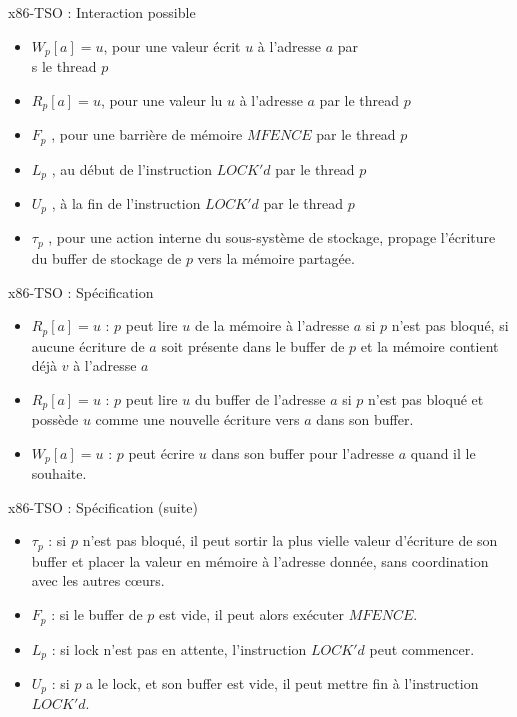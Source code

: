 \documentclass{beamer}
\begin{document}
\begin{frame}{x86-TSO : Interaction possible}
\begin{itemize}
	\item $W_p[a]=u$, pour une valeur écrit $u$ à l'adresse $a$ par \\s le thread $p$	
	\item $R_p[a]=u$, pour une valeur lu $u$ à l'adresse $a$ par le thread $p$
	\item $F_p$ , pour une barrière de mémoire $MFENCE$ par le thread $p$
	\item $L_p$ , au début de l'instruction $LOCK'd$ par le thread $p$
	\item $U_p$ , à la fin de l'instruction $LOCK'd$ par le thread $p$
	\item $\tau_p$ , pour une action interne du sous-système de stockage, propage l'écriture du buffer de stockage de $p$ vers la mémoire partagée.
\end{itemize}
\end{frame}


\begin{frame}{x86-TSO : Spécification}
\begin{itemize}
	\item $R_p[a] = u$ : $p$ peut lire $u$ de la mémoire à l'adresse $a$ si $p$ n'est pas bloqué, si aucune écriture de $a$ soit présente dans le buffer de $p$ et la mémoire contient déjà $v$ à l'adresse $a$
	\item $R_p[a] = u$ : $p$ peut lire $u$ du buffer de l'adresse $a$ si $p$ n'est pas bloqué et possède $u$ comme une nouvelle écriture vers $a$ dans son buffer.
	\item $W_p[a] = u$ : $p$ peut écrire $u$ dans son buffer pour l'adresse $a$ quand il le souhaite.
\end{itemize}

\end{frame}
\begin{frame}{x86-TSO : Spécification (suite)}
	
\begin{itemize}
	\item $\tau_p$ : si $p$ n'est pas bloqué, il peut sortir la plus vielle valeur d'écriture de son buffer et placer la valeur en mémoire à l'adresse donnée, sans coordination avec les autres cœurs.
	\item $F_p$ : si le buffer de $p$ est vide, il peut alors exécuter $MFENCE$.
	\item $L_p$ : si lock n'est pas en attente, l'instruction $LOCK'd$ peut commencer.
	\item $U_p$ : si $p$ a le lock, et son buffer est vide, il peut mettre fin à l'instruction $LOCK'd$.
\end{itemize}
\end{frame}
\end{document}
